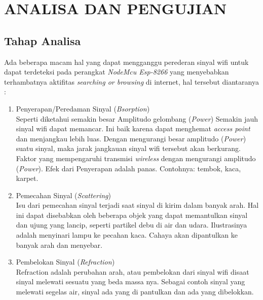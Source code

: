 \documentclass[conference]{IEEEtran}
\begin{document}
\section{ANALISA DAN PENGUJIAN}
\subsection{Tahap Analisa}
Ada beberapa macam hal yang dapat mengganggu perederan sinyal wifi
untuk dapat terdeteksi pada perangkat \textit{NodeMcu Esp-8266} yang menyebabkan
terhambatnya aktifitas \textit{searching or browsing} di internet, hal tersebut
diantaranya :
\begin{enumerate}
    \item Penyerapan/Peredaman Sinyal (\textit{Bsorption})\\
    Seperti diketahui semakin besar Amplitudo gelombang (\textit{Power}) Semakin jauh sinyal wifi dapat memancar. Ini baik karena dapat menghemat \textit{access point} dan menjangkau lebih luas. Dengan mengurangi besar amplitudo (\textit{Power}) suatu sinyal, maka jarak jangkauan sinyal wifi tersebut akan berkurang. Faktor yang mempengaruhi transmisi \textit{wireless} dengan mengurangi amplitudo (\textit{Power}). Efek dari Penyerapan adalah panas. Contohnya: tembok, kaca, karpet.
    \item Pemecahan Sinyal (\textit{Scattering})\\
    Isu dari pemecahan sinyal terjadi saat sinyal di kirim dalam banyak arah. Hal ini dapat disebabkan oleh beberapa objek yang dapat memantulkan sinyal dan ujung yang lancip, seperti partikel debu di air dan udara. Ilustrasinya adalah menyinari lampu ke pecahan kaca. Cahaya akan dipantulkan ke banyak arah dan menyebar.
    \item Pembelokan Sinyal (\textit{Refraction})\\
    Refraction adalah perubahan arah, atau pembelokan dari sinyal wifi disaat sinyal melewati sesuatu yang beda massa nya. Sebagai contoh sinyal yang melewati segelas air, sinyal ada yang di pantulkan dan ada yang dibelokkan.
\end{enumerate}
\end{document}
